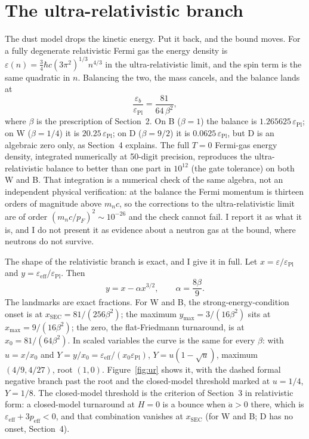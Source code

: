 \documentclass[11pt]{article}
\newcommand{\epsPl}{\varepsilon_{\mathrm{Pl}}}
\begin{document}
\section{The ultra-relativistic branch}

The dust model drops the kinetic energy. Put it back, and the bound
moves. For a fully degenerate relativistic Fermi gas the energy density
is $\varepsilon(n) = \tfrac34\hbar c(3\pi^2)^{1/3}n^{4/3}$ in the
ultra-relativistic limit, and the spin term is the same quadratic in $n$.
Balancing the two, the mass cancels, and the balance lands at
\begin{equation}
\frac{\varepsilon_b}{\epsPl} = \frac{81}{64\,\beta^2},
\end{equation}
where $\beta$ is the prescription of Section~2. On B ($\beta = 1$) the
balance is $1.265625\,\epsPl$; on W ($\beta = 1/4$) it is
$20.25\,\epsPl$; on D ($\beta = 9/2$) it is $0.0625\,\epsPl$, but D is
an algebraic zero only, as Section~4 explains. The full $T = 0$
Fermi-gas energy density, integrated numerically at 50-digit precision,
reproduces the ultra-relativistic balance to better than one part in
$10^{12}$ (the gate tolerance) on both W and B. That integration is a
numerical check of the same algebra, not an independent physical
verification: at the balance the Fermi momentum is thirteen orders of
magnitude above $m_n c$, so the corrections to the ultra-relativistic
limit are of order $(m_n c/p_F)^2 \sim 10^{-26}$ and the check cannot
fail. I report it as what it is, and I do not present it as evidence
about a neutron gas at the bound, where neutrons do not survive.

The shape of the relativistic branch is exact, and I give it in full.
Let $x = \varepsilon/\epsPl$ and $y = \varepsilon_{\mathrm{eff}}/
\epsPl$. Then
\begin{equation}
y = x - \alpha x^{3/2}, \qquad \alpha = \frac{8\beta}{9}.
\end{equation}
The landmarks are exact fractions. For W and B, the
strong-energy-condition onset is at $x_{\mathrm{SEC}} = 81/(256\beta^2)$;
the maximum $y_{\max} = 3/(16\beta^2)$ sits at $x_{\max} = 9/(16\beta^2)$;
the zero, the flat-Friedmann turnaround, is at $x_0 = 81/(64\beta^2)$. In
scaled variables the curve is the same for every $\beta$: with
$u = x/x_0$ and $Y = y/x_0 = \varepsilon_{\mathrm{eff}}/(x_0\epsPl)$,
$Y = u(1-\sqrt{u})$, maximum $(4/9, 4/27)$, root $(1, 0)$.
Figure~\ref{fig:ur} shows it, with the dashed formal negative
branch past the root and the closed-model threshold marked at
$u = 1/4$, $Y = 1/8$. The closed-model threshold is the criterion of
Section~3 in relativistic form: a closed-model turnaround at $H = 0$ is
a bounce when $\ddot a > 0$ there, which is
$\varepsilon_{\mathrm{eff}} + 3p_{\mathrm{eff}} < 0$, and that
combination vanishes at $x_{\mathrm{SEC}}$ (for W and B; D has no
onset, Section~4).
\end{document}
